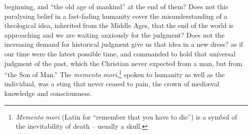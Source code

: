 beginning, and \enquote{the old age of mankind} at the end of them? Does not
this paralysing belief in a fast-fading humanity cover the
misunderstanding of a theological idea, inherited from the Middle
Ages, that the end of the world is approaching and we are waiting
anxiously for the judgment? Does not the increasing demand for
historical judgment give us that idea in a new dress? as if our time
were the latest possible time, and commanded to hold that universal
judgment of the past, which the Christian never expected from a man,
but from \enquote{the Son of Man.} The \textit{memento mori},\footnote{\textit{Memento mori} (Latin for \enquote{remember that you have to die}) is a symbol of the inevitability of death -- usually a skull.} spoken to humanity as
well as the individual, was a sting that never ceased to pain, the
crown of mediæval knowledge and consciousness.

